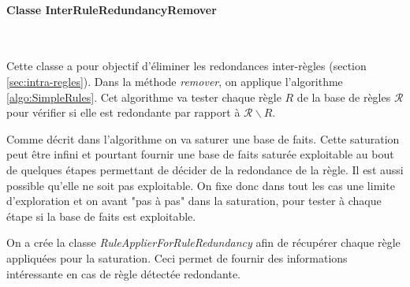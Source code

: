     \paragraph{Classe InterRuleRedundancyRemover}\ 
        \par Cette classe a pour objectif d'éliminer les redondances inter-règles (section \ref{sec:intra-regles}). Dans la méthode \textit{remover}, on applique l'algorithme \ref{algo:SimpleRules}. Cet algorithme va tester chaque règle $R$ de la base de règles $\mathcal{R}$ pour vérifier si elle est redondante par rapport à $\mathcal{R} \backslash R$. 
        \par Comme décrit dans l'algorithme on va saturer une base de faits. Cette saturation peut être infini et pourtant fournir une base de faits saturée exploitable au bout de quelques étapes permettant de décider de la redondance de la règle. Il est aussi possible qu'elle ne soit pas exploitable. On fixe donc dans tout les cas une limite d'exploration et on avant "pas à pas" dans la saturation, pour tester à chaque étape si la base de faits est exploitable. 
        \par On a crée la classe \textit{RuleApplierForRuleRedundancy} afin de récupérer chaque règle appliquées pour la saturation. Ceci permet de fournir des informations intéressante en cas de règle détectée redondante. 
        

